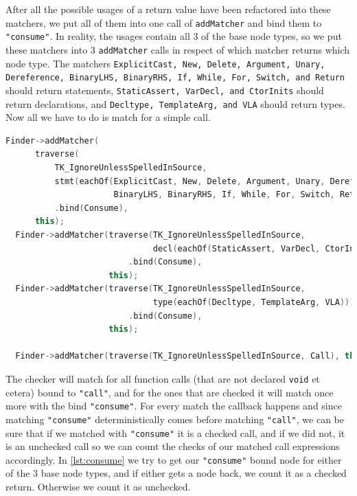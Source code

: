 After all the possible usages of a return value have been
refactored into these matchers, we put all of them into one call of \texttt{addMatcher} and bind them to
\texttt{"consume"}. In reality, the usages contain all 3 of the base node types, so we put these matchers into 3 \texttt{addMatcher} calls
in respect of which matcher returns which node type. The matchers \texttt{ExplicitCast, New, Delete, Argument, Unary, Dereference,
BinaryLHS, BinaryRHS, If, While, For, Switch, and Return} should return statements, \texttt{StaticAssert, VarDecl, and CtorInits}
should return declarations, and \texttt{Decltype, TemplateArg, and VLA} should return types.
Now all we have to do is match for a simple call.

\begin{lstlisting}[language={C++},caption={Separating the matchers to statement, declaration, and type.}]
  Finder->addMatcher(
	  traverse(
		  TK_IgnoreUnlessSpelledInSource,
		  stmt(eachOf(ExplicitCast, New, Delete, Argument, Unary, Dereference,
					  BinaryLHS, BinaryRHS, If, While, For, Switch, Return)))
		  .bind(Consume),
	  this);
  Finder->addMatcher(traverse(TK_IgnoreUnlessSpelledInSource,
							  decl(eachOf(StaticAssert, VarDecl, CtorInits)))
					     .bind(Consume),
				     this);
  Finder->addMatcher(traverse(TK_IgnoreUnlessSpelledInSource,
							  type(eachOf(Decltype, TemplateArg, VLA)))
					     .bind(Consume),
				     this);

  Finder->addMatcher(traverse(TK_IgnoreUnlessSpelledInSource, Call), this);
\end{lstlisting}

The checker will match for all function calls (that are not declared \lstinline{void} et cetera) bound to \texttt{"call"}, and for the ones
that are checked it will match once more with the bind \texttt{"consume"}. For every match the callback happens and since matching \texttt{"consume"}
deterministically comes before matching \texttt{"call"}, we can be sure that if we matched with \texttt{"consume"} it is a checked call, and if we did
not, it is an unchecked call so we can count the checks of our matched call expressions accordingly. In \cref{lst:consume} we try to
get our \texttt{"consume"} bound node for either of the 3 base node types, and if either gets a node back, we count it as a checked return.
Otherwise we count it as unchecked.

